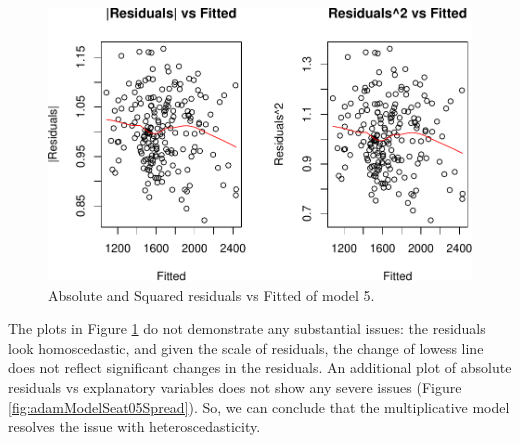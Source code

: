 \documentclass[
]{book}
\newenvironment{Shaded}{\begin{snugshade}}{\end{snugshade}}
\newcommand{\AttributeTok}[1]{\textcolor[rgb]{0.77,0.63,0.00}{#1}}
\newcommand{\ConstantTok}[1]{\textcolor[rgb]{0.00,0.00,0.00}{#1}}
\newcommand{\DecValTok}[1]{\textcolor[rgb]{0.00,0.00,0.81}{#1}}
\newcommand{\FunctionTok}[1]{\textcolor[rgb]{0.00,0.00,0.00}{#1}}
\newcommand{\NormalTok}[1]{#1}
\newcommand{\SpecialCharTok}[1]{\textcolor[rgb]{0.00,0.00,0.00}{#1}}
\theoremstyle{definition}
\theoremstyle{definition}
\theoremstyle{definition}
\theoremstyle{definition}
\theoremstyle{remark}
\begin{document}
\begin{figure}
\centering
\includegraphics{Svetunkov--2022----ADAM_files/figure-latex/adamModelSeat05HeteroPlot-1.pdf}
\caption{\label{fig:adamModelSeat05HeteroPlot}Absolute and Squared residuals vs Fitted of model 5.}
\end{figure}

The plots in Figure \ref{fig:adamModelSeat05HeteroPlot} do not demonstrate any substantial issues: the residuals look homoscedastic, and given the scale of residuals, the change of lowess line does not reflect significant changes in the residuals. An additional plot of absolute residuals vs explanatory variables does not show any severe issues (Figure \ref{fig:adamModelSeat05Spread}). So, we can conclude that the multiplicative model resolves the issue with heteroscedasticity.

\begin{Shaded}
\end{Shaded}
\end{document}
